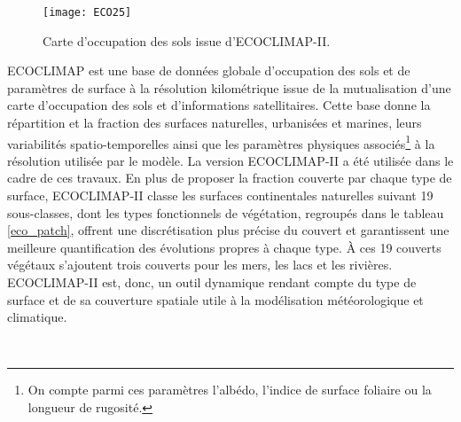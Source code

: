 \begin{figure}[h!]
\centering
  \texttt{[image: ECO25]}
  \caption{Carte d'occupation des sols issue d'ECOCLIMAP-II.}
  \label{ecoclimap}
\end{figure}

\noindent ECOCLIMAP est une base de données globale d'occupation des sols et de paramètres de surface à la résolution kilométrique issue de la mutualisation d'une carte d'occupation des sols et d'informations satellitaires. Cette base donne la répartition et la fraction des surfaces naturelles, urbanisées et marines, leurs variabilités spatio-temporelles ainsi que les paramètres physiques associés\footnote{On compte parmi ces paramètres l'albédo, l'indice de surface foliaire ou la longueur de rugosité.} à la résolution utilisée par le modèle. La version ECOCLIMAP-II a été utilisée dans le cadre de ces travaux. En plus de proposer la fraction couverte par chaque type de surface, ECOCLIMAP-II classe les surfaces continentales naturelles suivant 19 sous-classes, dont les types fonctionnels de végétation, regroupés dans le tableau \ref{eco_patch}, offrent une discrétisation plus précise du couvert et garantissent une meilleure quantification des évolutions propres à chaque type. À ces 19 couverts végétaux s'ajoutent trois couverts pour les mers, les lacs et les rivières.\\
ECOCLIMAP-II est, donc, un outil dynamique rendant compte du type de surface et de sa couverture spatiale utile à la modélisation météorologique et climatique.

~\\

